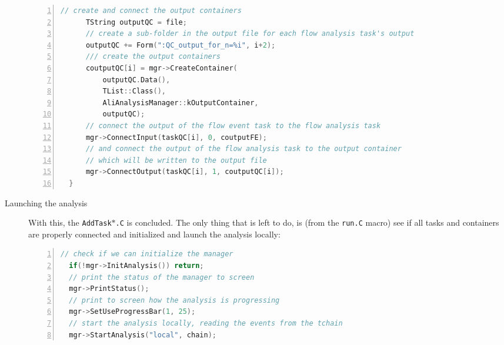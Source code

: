 \documentclass[a4paper]{book}
\numberwithin{equation}{subsection}
\begin{document}
\begin{description}
\begin{lstlisting}[language=C, numbers=left]
      // create and connect the output containers
      TString outputQC = file;
      // create a sub-folder in the output file for each flow analysis task's output
      outputQC += Form(":QC_output_for_n=%i", i+2);
      /// create the output containers
      coutputQC[i] = mgr->CreateContainer(
          outputQC.Data(),
          TList::Class(),
          AliAnalysisManager::kOutputContainer,
          outputQC);
      // connect the output of the flow event task to the flow analysis task
      mgr->ConnectInput(taskQC[i], 0, coutputFE);
      // and connect the output of the flow analysis task to the output container
      // which will be written to the output file
      mgr->ConnectOutput(taskQC[i], 1, coutputQC[i]);
  }\end{lstlisting}
      \item[Launching the analysis]
          With this, the \texttt{AddTask$\ast$.C} is concluded. The only thing that is left to do, is (from the \texttt{run.C} macro) see if all tasks and containers are properly connected and initialized and launch the analysis locally:
\begin{lstlisting}[language=C, numbers=left]
  // check if we can initialize the manager
  if(!mgr->InitAnalysis()) return;   
  // print the status of the manager to screen 
  mgr->PrintStatus();
  // print to screen how the analysis is progressing
  mgr->SetUseProgressBar(1, 25);
  // start the analysis locally, reading the events from the tchain
  mgr->StartAnalysis("local", chain);\end{lstlisting}
\end{description}
\end{document}

